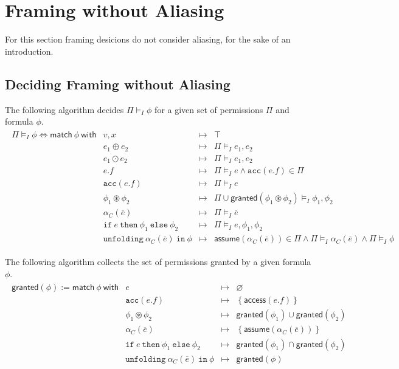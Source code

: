 \documentclass{article}
\newcommand{\tsf}{\textsf}
\newcommand{\ttt}{\texttt}
\newcommand{\access}{\tsf{access}}
\newcommand{\assume}{\tsf{assume}}
\newcommand{\frames}{\vDash_I}
\newcommand{\mt}{\mapsto}
\newcommand{\set}[1]{\left\{ #1 \right\}}
\newcommand{\cast}{\circledast}
\renewcommand{\vec}{\overline}
\renewcommand{\empty}{\varnothing}
\newcommand{\cif}{\ttt{if}}
\newcommand{\cthen}{\ttt{then}}
\newcommand{\celse}{\ttt{else}}
\newcommand{\cacc}{\ttt{acc}}
\newcommand{\cunfolding}{\ttt{unfolding}}
\newcommand{\cin}{\ttt{in}}
\newcommand{\granted}{\tsf{granted}}
\begin{document}
\section{Framing without Aliasing}

For this section framing desicions do not consider aliasing, for the sake of an introduction.

\subsection{Deciding Framing without Aliasing}

\noindent
The following algorithm decides $\Pi \frames \phi$ for a given set of permissions $\Pi$ and formula $\phi$.
\begin{align*}
\begin{array}{r|lrl}
\Pi \frames \phi
\iff \tsf{match} \ \phi \ \tsf{with}
%
%
& v, x                &\mt& \top
\\
& e_1 \oplus e_2      &\mt& \Pi \frames e_1, e_2
\\
& e_1 \odot e_2       &\mt& \Pi \frames e_1, e_2
\\
& e.f                 &\mt& \Pi \frames e
                      \land \cacc(e.f) \in \Pi
\\
%
& \cacc(e.f)          &\mt& \Pi \frames e
\\
& \phi_1 \cast \phi_2 &\mt& \Pi \cup \tsf{granted}(\phi_1 \cast \phi_2) \frames \phi_1, \phi_2
\\
& \alpha_C(\vec{e})   &\mt& \Pi \frames \vec{e}
\\
& \cif \ e \ \cthen \ \phi_1 \ \celse \ \phi_2
                      &\mt& \Pi \frames e, \phi_1, \phi_2
\\
& \cunfolding \ \alpha_C(\vec{e}) \ \cin \ \phi
                      &\mt& \assume(\alpha_C(\vec{e})) \in \Pi
                      \land \Pi \frames \alpha_C(\vec{e})
                      \land \Pi \frames \phi
\end{array}
\end{align*}

\noindent
The following algorithm collects the set of permissions granted by a given formula $\phi$.
\begin{align*}
\begin{array}{r|lrl}
\granted(\phi)
:= \tsf{match} \ \phi \ \tsf{with}
%
%
& e &\mt& \empty
\\
%
%
& \cacc(e.f)          &\mt& \set{ \access(e.f) }
\\
& \phi_1 \cast \phi_2 &\mt& \granted(\phi_1)
                      \cup  \granted(\phi_2)
\\
& \alpha_C(\vec{e})   &\mt& \set{ \assume(\alpha_C(\vec{e})) }
\\
& \cif \ e \ \cthen \ \phi_1 \ \celse \ \phi_2
                      &\mt& \granted(\phi_1) \cap \granted(\phi_2)
\\
& \cunfolding \ \alpha_C(\vec{e}) \ \cin \ \phi
                      &\mt& \granted(\phi)
\end{array}
\end{align*}
\end{document}
